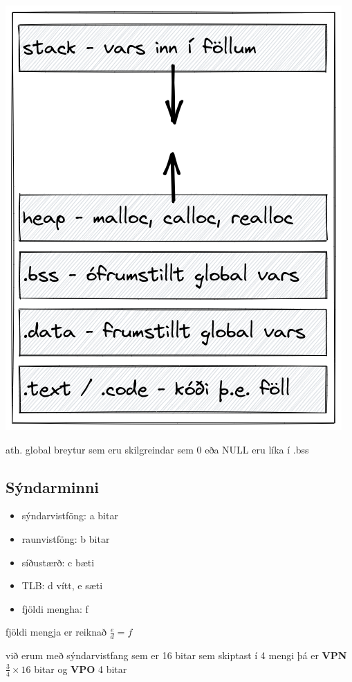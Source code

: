 \documentclass{article}
\begin{document}
\includegraphics[scale = 0.4]{minni.excalidraw.png}

ath. global breytur sem eru skilgreindar sem 0 eða NULL eru líka í .bss
\newpage

\subsection{Sýndarminni}
\begin{itemize}
    \item sýndarvistföng: a bitar
    \item raunvistföng: b bitar
    \item síðustærð: c bæti
    \item TLB: d vítt, e sæti
    \item fjöldi mengha: f
\end{itemize}

fjöldi mengja er reiknað $\frac{e}{d} = f$

við erum með sýndarvistfang sem er 16 bitar sem skiptast í 4 mengi
þá er \textbf{VPN}$\frac{3}{4} \times 16$ bitar og \textbf{VPO} 4 bitar
\end{document}
